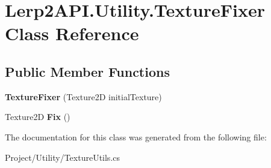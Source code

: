 \hypertarget{class_lerp2_a_p_i_1_1_utility_1_1_texture_fixer}{}\section{Lerp2\+A\+P\+I.\+Utility.\+Texture\+Fixer Class Reference}
\label{class_lerp2_a_p_i_1_1_utility_1_1_texture_fixer}
\subsection*{Public Member Functions}
\begin{DoxyCompactItemize}
\item 
\mbox{\label{class_lerp2_a_p_i_1_1_utility_1_1_texture_fixer_a9d143e2c76193174a15573210b6cffad}} 
{\bfseries Texture\+Fixer} (Texture2D initial\+Texture)
\item 
\mbox{\label{class_lerp2_a_p_i_1_1_utility_1_1_texture_fixer_a65f0a37ada97895b5045b94192e28d9f}} 
Texture2D {\bfseries Fix} ()
\end{DoxyCompactItemize}


The documentation for this class was generated from the following file\+:\begin{DoxyCompactItemize}
\item 
Project/\+Utility/Texture\+Utils.\+cs\end{DoxyCompactItemize}
